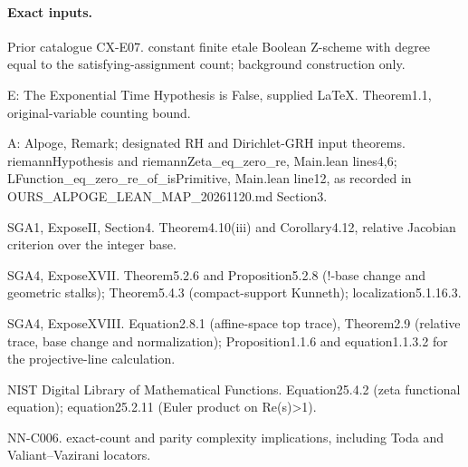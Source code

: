\paragraph{Exact inputs.}
Prior catalogue CX-E07. constant finite etale Boolean Z-scheme with degree equal to the satisfying-assignment count; background construction only.

E: The Exponential Time Hypothesis is False, supplied LaTeX. Theorem1.1, original-variable counting bound.

A: Alpoge, Remark; designated RH and Dirichlet-GRH input theorems. riemannHypothesis and riemannZeta\_eq\_zero\_re, Main.lean lines4,6; LFunction\_eq\_zero\_re\_of\_isPrimitive, Main.lean line12, as recorded in OURS\_ALPOGE\_LEAN\_MAP\_20261120.md Section3.

SGA1, ExposeII, Section4. Theorem4.10(iii) and Corollary4.12, relative Jacobian criterion over the integer base.

SGA4, ExposeXVII. Theorem5.2.6 and Proposition5.2.8 (!-base change and geometric stalks); Theorem5.4.3 (compact-support Kunneth); localization5.1.16.3.

SGA4, ExposeXVIII. Equation2.8.1 (affine-space top trace), Theorem2.9 (relative trace, base change and normalization); Proposition1.1.6 and equation1.1.3.2 for the projective-line calculation.

NIST Digital Library of Mathematical Functions. Equation25.4.2 (zeta functional equation); equation25.2.11 (Euler product on Re(s)>1).

NN-C006. exact-count and parity complexity implications, including Toda and Valiant--Vazirani locators.

